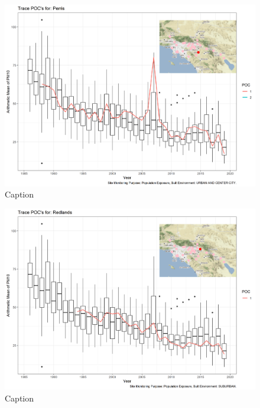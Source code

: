 \begin{figure}
    \centering
    \includegraphics[width = \textwidth]{Figures/IndividualSiteTraces/TracePOC_Perris.png}
    \caption{Caption}
    \label{fig:my_label}
\end{figure}

\begin{figure}
    \centering
    \includegraphics[width = \textwidth]{Figures/IndividualSiteTraces/TracePOC_Redlands.png}
    \caption{Caption}
    \label{fig:my_label}
\end{figure}

